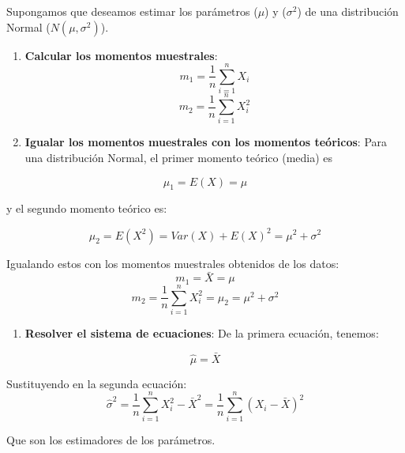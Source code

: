 \documentclass[
  letterpaper,
  DIV=11,
  numbers=noendperiod]{scrreprt}
\providecommand{\tightlist}{%
  \setlength{\itemsep}{0pt}\setlength{\parskip}{0pt}}\usepackage{longtable,booktabs,array}
\begin{document}
\begin{tcolorbox}[enhanced jigsaw, arc=.35mm, breakable, coltitle=black, left=2mm, opacityback=0, bottomtitle=1mm, colbacktitle=quarto-callout-tip-color!10!white, title=\textcolor{quarto-callout-tip-color}{\faLightbulb}\hspace{0.5em}{Ejemplo, distribución Normal}, titlerule=0mm, colback=white, colframe=quarto-callout-tip-color-frame, bottomrule=.15mm, rightrule=.15mm, opacitybacktitle=0.6, toptitle=1mm, toprule=.15mm, leftrule=.75mm]

Supongamos que deseamos estimar los parámetros (\(\mu\)) y
(\(\sigma^2\)) de una distribución Normal (\(N(\mu, \sigma^2)\)).

\begin{enumerate}
\def\labelenumi{\arabic{enumi}.}
\item
  \textbf{Calcular los momentos muestrales}:
  \[m_1 = \frac{1}{n} \sum_{i=1}^n X_i \]
  \[m_2 = \frac{1}{n}\sum_{i=1}^nX_i^2 \]
\item
  \textbf{Igualar los momentos muestrales con los momentos teóricos}:
  Para una distribución Normal, el primer momento teórico (media) es
\end{enumerate}

\[\mu_1=E(X)=\mu\]

y el segundo momento teórico es:

\[\mu_2=E(X^2)=Var(X)+E(X)^2=\mu^2 + \sigma^2\]

Igualando estos con los momentos muestrales obtenidos de los datos:
\[m_1 = \bar{X}=\mu\]
\[m_2 = \frac{1}{n}\sum_{i=1}^n X_i^2=\mu_2= \mu^2 + \sigma^2\]

\begin{enumerate}
\def\labelenumi{\arabic{enumi}.}
\setcounter{enumi}{2}
\tightlist
\item
  \textbf{Resolver el sistema de ecuaciones}: De la primera ecuación,
  tenemos:
\end{enumerate}

\[\hat{\mu} = \bar{X}\]

Sustituyendo en la segunda ecuación:
\[\hat{\sigma}^2=\frac{1}{n}\sum_{i=1}^n X_i^2-\bar{X}^2=\frac{1}{n}\sum_{i=1}^n (X_i-\bar{X})^2\]

Que son los estimadores de los parámetros.

\end{tcolorbox}
\end{document}
